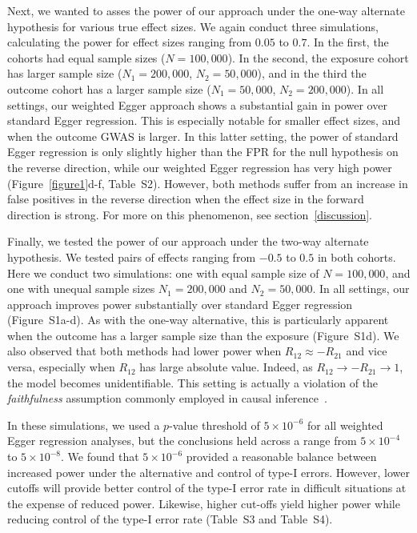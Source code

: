 \documentclass{article}
\begin{document}
Next, we wanted to asses the power of our approach under the one-way alternate
hypothesis for various true effect sizes. We again conduct three simulations,
calculating the power for effect sizes ranging from $0.05$ to $0.7$.
In the first, the cohorts had equal sample sizes ($N = 100,000$). In the second, the exposure
cohort has larger sample size ($N_1 = 200,000$, $N_2 = 50,000$),
and in the third the outcome cohort has a larger sample size ($N_1 = 50,000$, $N_2 = 200,000$).
In all settings, our weighted Egger approach shows
a substantial gain in power over standard Egger regression. This is especially
notable for smaller effect sizes, and when the outcome GWAS is larger.
In this latter setting, the power of standard Egger regression is only slightly
higher than the FPR for the null hypothesis on the reverse direction,
while our weighted Egger regression has very high power
(Figure~\ref{figure1}d-f, Table~S2). However, both
methods suffer from an increase in false positives in the reverse direction
when the effect size in the forward direction is strong. For more on this
phenomenon, see section~\ref{discussion}.

Finally, we tested the power of our approach under the two-way alternate
hypothesis. We tested pairs of effects ranging from $-0.5$ to $0.5$ in both cohorts.
Here we conduct two simulations: one with equal sample size of $N=100,000$,
and one with unequal sample sizes $N_1 = 200,000$ and $N_2 = 50,000$.
In all settings, our approach improves power
substantially over standard Egger regression (Figure~S1a-d). As with
the one-way alternative, this is particularly apparent when the outcome has a larger
sample size than the exposure (Figure~S1d). We also observed that both
methods had lower power when $R_{12} \approx -R_{21}$ and vice versa, especially when
$R_{12}$ has large absolute value. Indeed, as $R_{12} \rightarrow -R_{21} \rightarrow 1$, the model
becomes unidentifiable. This setting is actually a violation of the \emph{faithfulness}
assumption commonly employed in causal inference~\cite{Pearl2000}.


In these simulations, we used a $p$-value threshold of $5\times 10^{-6}$
for all weighted Egger regression analyses, but the conclusions held across a range
from $5\times 10^{-4}$ to $5\times 10^{-8}$. We found that
$5\times 10^{-6}$ provided a reasonable balance between increased power under 
the alternative and control of type-I errors. However, lower
cutoffs will provide better control of the type-I error rate in difficult situations
at the expense of reduced power. Likewise, higher cut-offs yield higher power
while reducing control of the type-I error rate
(Table~S3 and Table~S4). 
\end{document}
